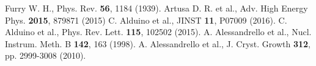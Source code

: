 \documentclass[12pt]{article}
\def\Acknowledgements{\bigskip  \bigskip \begin{center} \begin{large}
             \bf ACKNOWLEDGEMENTS \end{large}\end{center}}
\begin{document}
\begin{thebibliography}{99}


Furry W. H., Phys. Rev. {\bf56}, 1184 (1939).
Artusa D. R. et al., Adv. High Energy Phys. {\bf2015}, 879871 (2015)
C. Alduino et al., JINST {\bf11}, P07009 (2016).
C. Alduino et al., Phys. Rev. Lett. {\bf115}, 102502 (2015).
A. Alessandrello et al., Nucl. Instrum. Meth. B {\bf142}, 163 (1998).
A. Alessandrello et al., J. Cryst. Growth {\bf312}, pp. 2999-3008 (2010).


\end{thebibliography}

 
\end{document}
